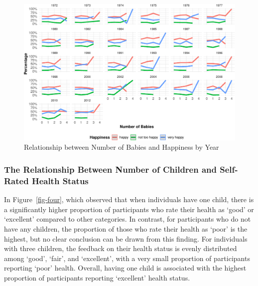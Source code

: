 \documentclass[
  letterpaper,
  DIV=11,
  numbers=noendperiod]{scrartcl}
\begin{document}
\begin{figure}

{\centering \includegraphics{paper_files/figure-pdf/fig-three-1.pdf}

}

\caption{\label{fig-three}Relationship between Number of Babies and
Happiness by Year}

\end{figure}

\hypertarget{the-relationship-between-number-of-children-and-self-rated-health-status}{%
\subsubsection{The Relationship Between Number of Children and
Self-Rated Health
Status}\label{the-relationship-between-number-of-children-and-self-rated-health-status}}

In Figure~\ref{fig-four}, which observed that when individuals have one
child, there is a significantly higher proportion of participants who
rate their health as `good' or `excellent' compared to other categories.
In contrast, for participants who do not have any children, the
proportion of those who rate their health as `poor' is the highest, but
no clear conclusion can be drawn from this finding. For individuals with
three children, the feedback on their health status is evenly
distributed among `good', `fair', and `excellent', with a very small
proportion of participants reporting `poor' health. Overall, having one
child is associated with the highest proportion of participants
reporting `excellent' health status.
\end{document}
